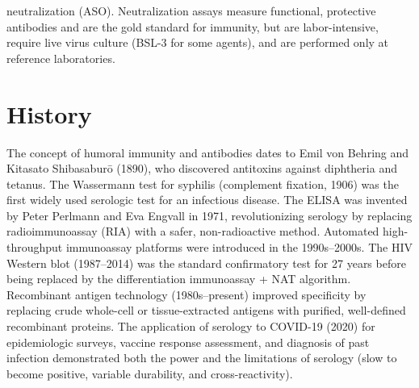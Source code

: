 neutralization (ASO). Neutralization assays measure functional, protective antibodies and are the gold standard for immunity, but are labor-intensive, require live virus culture (BSL-3 for some agents), and are performed only at reference laboratories.

\section*{History}
The concept of humoral immunity and antibodies dates to Emil von Behring and Kitasato Shibasaburō (1890), who discovered antitoxins against diphtheria and tetanus. The Wassermann test for syphilis (complement fixation, 1906) was the first widely used serologic test for an infectious disease. The ELISA was invented by Peter Perlmann and Eva Engvall in 1971, revolutionizing serology by replacing radioimmunoassay (RIA) with a safer, non-radioactive method. Automated high-throughput immunoassay platforms were introduced in the 1990s--2000s. The HIV Western blot (1987--2014) was the standard confirmatory test for 27 years before being replaced by the differentiation immunoassay + NAT algorithm. Recombinant antigen technology (1980s--present) improved specificity by replacing crude whole-cell or tissue-extracted antigens with purified, well-defined recombinant proteins. The application of serology to COVID-19 (2020) for epidemiologic surveys, vaccine response assessment, and diagnosis of past infection demonstrated both the power and the limitations of serology (slow to become positive, variable durability, and cross-reactivity).

